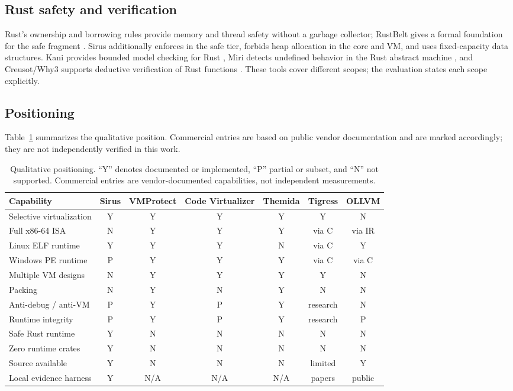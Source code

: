 \subsection{Rust safety and verification}

Rust's ownership and borrowing rules provide memory and thread safety without a
garbage collector; RustBelt gives a formal foundation for the safe
fragment \cite{jung2018rustbelt,rustref}. Sirus additionally enforces
 in the safe tier, forbids heap allocation in the core
and VM, and uses fixed-capacity data structures. Kani provides bounded model
checking for Rust \cite{kani}, Miri detects undefined behavior in the Rust
abstract machine \cite{miri}, and Creusot/Why3 supports deductive verification of
Rust functions \cite{creusot2022,why3_2013}. These tools cover different scopes;
the evaluation states each scope explicitly.

\subsection{Positioning}

Table~\ref{tab:related} summarizes the qualitative position. Commercial entries
are based on public vendor documentation and are marked accordingly; they are not
independently verified in this work.

\begin{table}[htbp]
\centering
\small
\caption{Qualitative positioning. ``Y'' denotes documented or implemented,
``P'' partial or subset, and ``N'' not supported. Commercial entries are
vendor-documented capabilities, not independent measurements.}
\label{tab:related}
\begin{tabularx}{\textwidth}{@{}lcccccc@{}}
\toprule
Capability & Sirus & VMProtect & Code Virtualizer & Themida & Tigress & OLLVM \\
\midrule
Selective virtualization & Y & Y & Y & Y & Y & N \\
Full x86-64 ISA & N & Y & Y & Y & via C & via IR \\
Linux ELF runtime & Y & Y & Y & N & via C & Y \\
Windows PE runtime & P & Y & Y & Y & via C & via C \\
Multiple VM designs & N & Y & Y & Y & Y & N \\
Packing & N & Y & N & Y & N & N \\
Anti-debug / anti-VM & P & Y & P & Y & research & N \\
Runtime integrity & P & Y & P & Y & research & P \\
Safe Rust runtime & Y & N & N & N & N & N \\
Zero runtime crates & Y & N & N & N & N & N \\
Source available & Y & N & N & N & limited & Y \\
Local evidence harness & Y & N/A & N/A & N/A & papers & public \\
\bottomrule
\end{tabularx}
\end{table}

